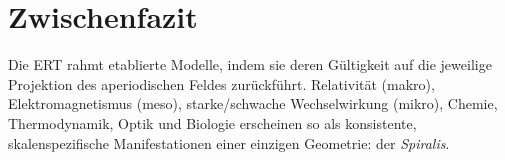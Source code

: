 \section{Zwischenfazit}
\label{sec:zwischenfazit7}
Die \acrshort{ERT} rahmt etablierte Modelle, indem sie deren Gültigkeit auf die jeweilige Projektion des aperiodischen Feldes zurückführt. 
Relativität (makro), Elektromagnetismus (meso), starke/schwache Wechselwirkung (mikro), Chemie, Thermodynamik, Optik und Biologie erscheinen so als konsistente, 
skalenspezifische Manifestationen einer einzigen Geometrie: der \emph{Spiralis}.
